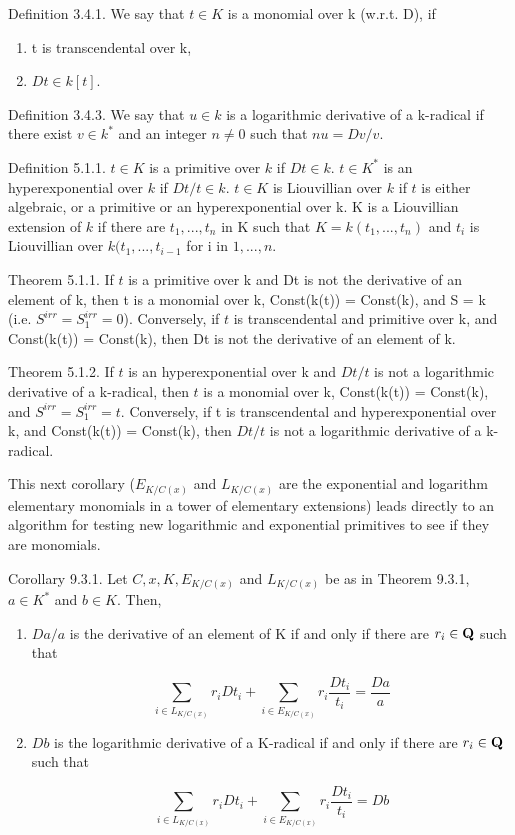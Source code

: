 \vfill\eject
{}

Definition 3.4.1. We say that $t \in K$ is a monomial over k (w.r.t. D), if
\begin{enumerate}
\item t is transcendental over k,
\item $Dt \in k[t]$.
\end{enumerate}

Definition 3.4.3. We say that $u \in k$ is a logarithmic derivative of
a k-radical if there exist $v \in k^*$ and an integer $n \ne 0$ such
that $nu = Dv/v$.

Definition 5.1.1. $t \in K$ is a primitive over $k$ if $Dt \in
k$. $t \in K^*$ is an hyperexponential over $k$ if $Dt/t \in
k$. $t \in K$ is Liouvillian over $k$ if $t$ is either algebraic, or a
primitive or an hyperexponential over k. K is a Liouvillian extension
of $k$ if there are $t_1, ... , t_n$ in K such that $K = k(t_1, ... ,
t_n)$ and $t_i$ is Liouvillian over $k(t_1, ... , t_{i-1}$ for i in
${1, ... , n}$.

Theorem 5.1.1. If $t$ is a primitive over k and Dt is not the
derivative of an element of k, then t is a monomial over k,
Const(k(t)) = Const(k), and S = k (i.e. $S^{irr} = S_1^{irr} =
0$). Conversely, if $t$ is transcendental and primitive over k, and
Const(k(t)) = Const(k), then Dt is not the derivative of an element of
k.

Theorem 5.1.2. If $t$ is an hyperexponential over k and $Dt/t$ is not
a logarithmic derivative of a k-radical, then $t$ is a monomial over
k, Const(k(t)) = Const(k), and $S^{irr} = S_1^{irr} =
{t}$. Conversely, if t is transcendental and hyperexponential over k,
and Const(k(t)) = Const(k), then $Dt/t$ is not a logarithmic
derivative of a k-radical.

This next corollary ($E_{K/C(x)}$ and $L_{K/C(x)}$ are the exponential
and logarithm elementary monomials in a tower of elementary
extensions) leads directly to an algorithm for testing new logarithmic
and exponential primitives to see if they are monomials.

Corollary 9.3.1. Let $C, x, K, E_{K/C(x)}$ and $L_{K/C(x)}$ be as in Theorem 9.3.1,
$a \in K^*$ and $b \in K$. Then,
\begin{enumerate}
\item $Da/a$ is the derivative of an element of K if and only if there are $r_i \in \mathbf{Q}$
such that

\[ \sum_{i\in L_{K/C(x)}} r_iDt_i + \sum_{i\in E_{K/C(x)}} r_i\frac{Dt_i}{t_i} = \frac{Da}{a} \]

\item $Db$ is the logarithmic derivative of a K-radical if and only if there are $r_i \in \mathbf{Q}$
such that

\[ \sum_{i\in L_{K/C(x)}} r_iDt_i + \sum_{i\in E_{K/C(x)}} r_i\frac{Dt_i}{t_i} = Db \]
\end{enumerate}



